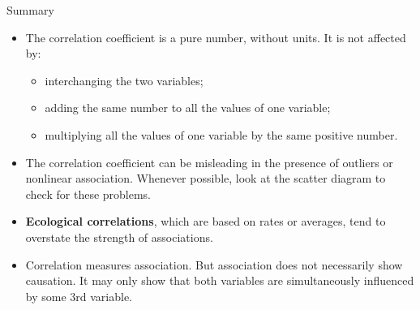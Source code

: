 \documentclass[
  ignorenonframetext,
]{beamer}
\begin{document}
\begin{frame}{Summary}
\protect\hypertarget{summary}{}
\linespread{1.1}
\begin{itemize}
\item The correlation coefficient is a pure number, without units. It is not affected by:
\begin{itemize}\normalsize
\item interchanging the two variables;
\item adding the same number to all the values of one variable;
\item multiplying all the values of one variable by the same positive
number.
\end{itemize}

\item The correlation coefficient can be misleading in the presence of
outliers or nonlinear association. Whenever possible, look at the
scatter diagram to check for these problems.

\item \textbf{Ecological correlations}, which are based on rates or averages,
tend to overstate the strength of associations.

\item Correlation measures association. But association does not necessarily
show causation. It may only show that both variables are simultaneously
influenced by some 3rd variable.
\end{itemize}
\end{frame}
\end{document}

